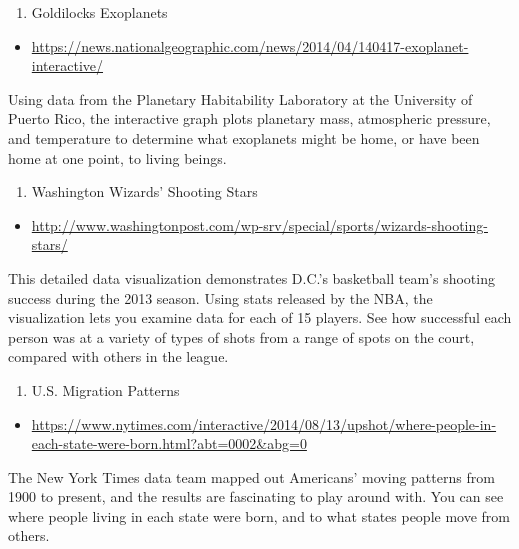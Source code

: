 \documentclass[]{book}
\providecommand{\tightlist}{%
  \setlength{\itemsep}{0pt}\setlength{\parskip}{0pt}}
\theoremstyle{definition}
\theoremstyle{definition}
\theoremstyle{definition}
\theoremstyle{remark}
\begin{document}
\begin{enumerate}
\def\labelenumi{\arabic{enumi}.}
\setcounter{enumi}{9}
\tightlist
\item
  Goldilocks Exoplanets
\end{enumerate}

\begin{itemize}
\tightlist
\item
  \url{https://news.nationalgeographic.com/news/2014/04/140417-exoplanet-interactive/}
\end{itemize}

Using data from the Planetary Habitability Laboratory at the University
of Puerto Rico, the interactive graph plots planetary mass, atmospheric
pressure, and temperature to determine what exoplanets might be home, or
have been home at one point, to living beings.

\begin{enumerate}
\def\labelenumi{\arabic{enumi}.}
\setcounter{enumi}{10}
\tightlist
\item
  Washington Wizards' Shooting Stars
\end{enumerate}

\begin{itemize}
\tightlist
\item
  \url{http://www.washingtonpost.com/wp-srv/special/sports/wizards-shooting-stars/}
\end{itemize}

This detailed data visualization demonstrates D.C.'s basketball team's
shooting success during the 2013 season. Using stats released by the
NBA, the visualization lets you examine data for each of 15 players. See
how successful each person was at a variety of types of shots from a
range of spots on the court, compared with others in the league.

\begin{enumerate}
\def\labelenumi{\arabic{enumi}.}
\setcounter{enumi}{11}
\tightlist
\item
  U.S. Migration Patterns
\end{enumerate}

\begin{itemize}
\tightlist
\item
  \url{https://www.nytimes.com/interactive/2014/08/13/upshot/where-people-in-each-state-were-born.html?abt=0002\&abg=0}
\end{itemize}

The New York Times data team mapped out Americans' moving patterns from
1900 to present, and the results are fascinating to play around with.
You can see where people living in each state were born, and to what
states people move from others.
\end{document}
